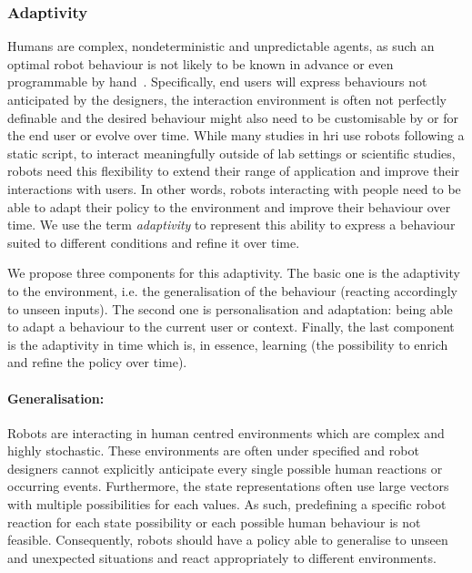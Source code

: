 \subsubsection{Adaptivity}	\label{ssec:adap}
    Humans are complex, nondeterministic and unpredictable agents, as such an optimal robot behaviour is not likely to be known in advance or even programmable by hand~\citep{dautenhahn2004robots,argall2009survey}. Specifically, end users will express behaviours not anticipated by the designers, the interaction environment is often not perfectly definable and the desired behaviour might also need to be customisable by or for the end user or evolve over time. While many studies in \gls{hri} use robots following a static script, to interact meaningfully outside of lab settings or scientific studies, robots need this flexibility to extend their range of application and improve their interactions with users. In other words, robots interacting with people need to be able to adapt their policy to the environment and improve their behaviour over time. We use the term \emph{adaptivity} to represent this ability to express a behaviour suited to different conditions and refine it over time. 
    
    We propose three components for this adaptivity. The basic one is the adaptivity to the environment, i.e. the generalisation of the behaviour (reacting accordingly to unseen inputs). The second one is personalisation and adaptation: being able to adapt a behaviour to the current user or context. Finally, the last component is the adaptivity in time which is, in essence, learning (the possibility to enrich and refine the policy over time). 
       
    \paragraph{Generalisation:} Robots are interacting in human centred environments which are complex and highly stochastic. These environments are often under specified and robot designers cannot explicitly anticipate every single possible human reactions or occurring events. Furthermore, the state representations often use large vectors with multiple possibilities for each values. As such, predefining a specific robot reaction for each state possibility or each possible human behaviour is not feasible. Consequently, robots should have a policy able to generalise to unseen and unexpected situations and react appropriately to different environments.
    
